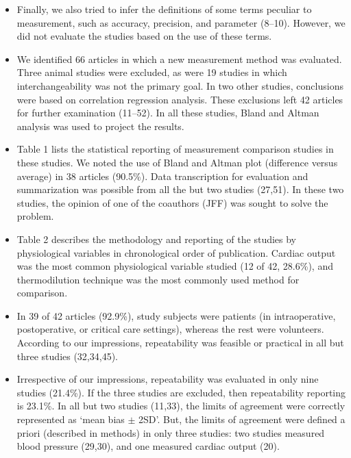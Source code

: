 \documentclass[MAIN.tex]{subfiles}
\begin{document}
	\begin{itemize}
	\item Finally, we also tried to infer the definitions of some terms peculiar to measurement, such as accuracy, precision, and parameter (8–10). However, we did not evaluate the studies based on the use of these terms.
	
	\item We identified 66 articles in which a new measurement method was evaluated. Three animal studies were excluded, as were 19 studies in which interchangeability was not the primary goal. In two other studies, conclusions were based on correlation regression analysis. These exclusions left 42 articles for further examination (11–52). In all these studies, Bland and Altman analysis was used to project the results. 
	
	\item Table 1 lists the statistical reporting of measurement comparison studies in these studies. We noted the use of Bland and Altman plot (difference versus average) in 38 articles (90.5\%). Data transcription for evaluation and summarization was possible from all the but two studies (27,51). In these two studies, the opinion of one of the coauthors (JFF) was sought to solve the problem.
	
	
	\item Table 2 describes the methodology and reporting of the studies by physiological variables in chronological order of publication. Cardiac output was the most common physiological variable studied (12 of 42, 28.6\%), and thermodilution technique was the most commonly used method for comparison. 
	\item In 39 of 42 articles (92.9\%), study subjects were patients (in intraoperative, postoperative, or critical care settings), whereas the rest were volunteers. According to our impressions, repeatability was feasible or practical in all but three studies (32,34,45). 
	
	\item Irrespective of our impressions, repeatability was evaluated in only nine studies (21.4\%). If the three studies are excluded, then repeatability reporting is 23.1\%. In all but two studies (11,33), the limits of agreement were correctly represented as ‘mean bias $\pm$ 2SD’. But, the limits of agreement were defined a priori (described in methods) in only three studies: two studies measured blood pressure (29,30), and one measured cardiac output (20). 
	\end{itemize}
\end{document}
